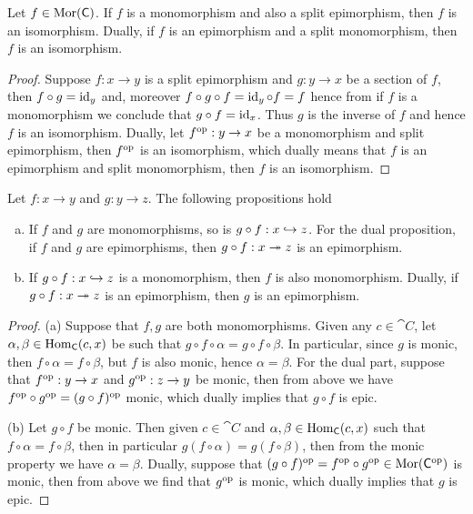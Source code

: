 \begin{proposition}
  Let \(f \in \operatorname{Mor}(\mathsf C)\). If \(f\) is a monomorphism and also a split
  epimorphism, then \(f\) is an isomorphism. Dually, if \(f\) is an epimorphism
  and a split monomorphism, then \(f\) is an isomorphism.
\end{proposition}

\begin{proof}
  Suppose \(f: x \to y\) is a split epimorphism and \(g: y \to x\) be a section
  of \(f\), then \(f \circ g = \operatorname{id}_y\) and, moreover \(f \circ g \circ f = \operatorname{id}_y
  \circ f = f\) hence from if \(f\) is a monomorphism we conclude that \(g
  \circ f = \operatorname{id}_x\). Thus \(g\) is the inverse of \(f\) and hence \(f\) is an
  isomorphism. Dually, let \(f^{\mathrm{op}}: y \to x\) be a monomorphism and split
  epimorphism, then \(f^{\mathrm{op}}\) is an isomorphism, which dually means that \(f\) 
  is an epimorphism and split monomorphism, then \(f\) is an isomorphism.
\end{proof}

\begin{lemma}
  Let \(f: x \to y\) and \(g: y \to z\). The following propositions hold
  \begin{enumerate}[(a).]
    \item If \(f\) and \(g\) are monomorphisms, so is \(g \circ f: x \hookrightarrow z\).
      For the dual proposition, if \(f\) and \(g\) are epimorphisms, then \(g
      \circ f: x \twoheadrightarrow z\) is an epimorphism.
    \item If \(g \circ f: x \hookrightarrow z\) is a monomorphism, then \(f\) is also
      monomorphism.  Dually, if \(g \circ f: x \twoheadrightarrow z\) is an epimorphism, then
      \(g\) is an epimorphism.
  \end{enumerate}
\end{lemma}

\begin{proof}
  (a) Suppose that \(f, g\) are both monomorphisms. Given any \(c \in \cat C\),
  let \(\alpha, \beta \in \operatorname{Hom}_{\mathsf C}(c, x)\) be such that \(g \circ f \circ
  \alpha = g \circ f \circ \beta\). In particular, since \(g\) is monic, then
  \(f \circ \alpha = f \circ \beta\), but \(f\) is also monic, hence \(\alpha =
  \beta\). For the dual part, suppose that \(f^{\mathrm{op}}: y \to x\) and \(g^{\mathrm{op}}: z \to
  y\) be monic, then from above we have \(f^{\mathrm{op}} \circ g^{\mathrm{op}} = (g \circ f)^{\mathrm{op}}\)
  monic, which dually implies that \(g \circ f\) is epic. 

  (b) Let \(g \circ f\) be monic. Then given \(c \in \cat C\) and \(\alpha,
  \beta \in \operatorname{Hom}_{\mathsf C}(c, x)\) such that \(f \circ \alpha = f \circ \beta\),
  then in particular \(g(f \circ \alpha) = g(f \circ \beta)\), then from the
  monic property we have \(\alpha = \beta\). Dually, suppose that \((g \circ
  f)^{\mathrm{op}} = f^{\mathrm{op}} \circ g^{\mathrm{op}} \in \operatorname{Mor}(\mathsf C^{\mathrm{op}})\) is monic, then from above we
  find that \(g^{\mathrm{op}}\) is monic, which dually implies that \(g\) is epic.
\end{proof}
